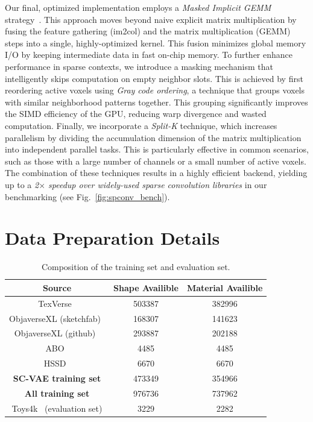 \documentclass[10pt,twocolumn,letterpaper]{article}
\begin{document}
Our final, optimized implementation employs a \emph{Masked Implicit GEMM} strategy~\cite{spconv2022}. This approach moves beyond naive explicit matrix multiplication by fusing the feature gathering (im2col) and the matrix multiplication (GEMM) steps into a single, highly-optimized kernel. This fusion minimizes global memory I/O by keeping intermediate data in fast on-chip memory. To further enhance performance in sparse contexts, we introduce a masking mechanism that intelligently skips computation on empty neighbor slots. This is achieved by first reordering active voxels using \emph{Gray code ordering}, a technique that groups voxels with similar neighborhood patterns together. This grouping significantly improves the SIMD efficiency of the GPU, reducing warp divergence and wasted computation. Finally, we incorporate a \emph{Split-K} technique, which increases parallelism by dividing the accumulation dimension of the matrix multiplication into independent parallel tasks. This is particularly effective in common scenarios, such as those with a large number of channels or a small number of active voxels. The combination of these techniques results in a highly efficient backend, yielding up to a \emph{2$\times$ speedup over widely-used sparse convolution libraries} in our benchmarking (see Fig.~\ref{fig:spconv_bench}).

\section{Data Preparation Details}

\begin{table}[t]
    \centering  
    \scriptsize
    \caption{Composition of the training set and evaluation set.}  
    \vspace{-8pt}
	\begin{tabular}{c|cc}  
        \toprule
        \textbf{Source} & \textbf{Shape Availible} & \textbf{Material Availible} \\
        \midrule  
        TexVerse~\cite{zhang2025texverse} & 503387 & 382996 \\
        ObjaverseXL (sketchfab)~\cite{deitke2024objaverse} & 168307 & 141623 \\
        ObjaverseXL (github)~\cite{deitke2024objaverse} & 293887 & 202188 \\
        ABO~\cite{collins2022abo} & 4485 & 4485 \\
        HSSD~\cite{khanna2023hssd} & 6670 & 6670 \\
        \textbf{SC-VAE training set} & 473349 & 354966 \\
        \textbf{All training set} & 976736 & 737962 \\
        \midrule  
        Toys4k~\cite{stojanov2021using} (evaluation set) & 3229 & 2282 \\
        \bottomrule
    \end{tabular}  
    \label{tab:dataset} 
\end{table}
\end{document}
